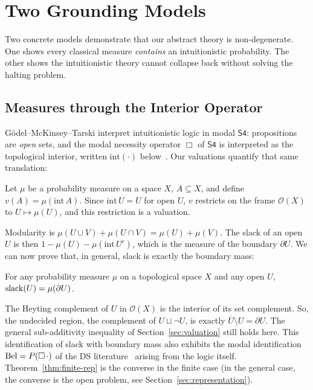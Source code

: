 \section{Two Grounding Models}
\label{sec:bridges}

Two concrete models demonstrate that our abstract theory is 
non-degenerate.  One shows every
classical measure \emph{contains} an intuitionistic probability.
The other shows the intuitionistic theory cannot collapse back
without solving the halting problem.

\subsection{Measures through the Interior Operator}
\label{sec:interior-bridge}

G\"odel--McKinsey--Tarski interpret intuitionistic logic in modal
$\mathsf{S4}$: propositions are \emph{open} sets, and
the modal necessity operator $\Box$ of $\mathsf{S4}$ is interpreted
as the topological interior, written $\mathrm{int}(\cdot)$
below~\cite{godel1933,mckinsey-tarski1944}.
Our valuations quantify that same translation:

\begin{theorem}
\label{thm:measure-valuation}
Let $\mu$ be a probability measure on a space $X$, $A \subseteq X$,
and define $v(A) = \mu(\mathrm{int}\,A)$.  Since
$\mathrm{int}\,U = U$ for open $U$, $v$ restricts on the frame
$\mathcal{O}(X)$ to $U \mapsto \mu(U)$, and this restriction is a
valuation.
\end{theorem}

\noindent
Modularity is $\mu(U \cup V) + \mu(U \cap V) = \mu(U) + \mu(V)$.
The slack of an open $U$ is then $1 - \mu(U) -
\mu(\mathrm{int}\,U^{c})$, which is the measure of the
boundary $\partial U$.  We can now prove that, in general, slack is
exactly the boundary mass:

\begin{theorem}
\label{thm:slack-frontier}
For any probability measure $\mu$ on a topological space $X$ and any
open $U$, $\mathrm{slack}(U) = \mu(\partial U)$.
\end{theorem}

\noindent
The Heyting complement of $U$ in $\mathcal{O}(X)$ is the interior of
its set complement. So, the undecided region, the complement of
$U \sqcup \neg U$, is exactly
$\overline{U} \setminus U = \partial U$.  The general sub-additivity
inequality of Section~\ref{sec:valuation} still holds here.  This
identification of slack with boundary mass also exhibits the modal
identification $\mathrm{Bel} = P(\Box\,\cdot)$ of the DS
literature~\cite{ruspini1986} arising from the logic itself.
Theorem~\ref{thm:finite-rep} is the
converse in the finite case (in the general case, the converse is the open
problem, see Section~\ref{sec:representation}).


